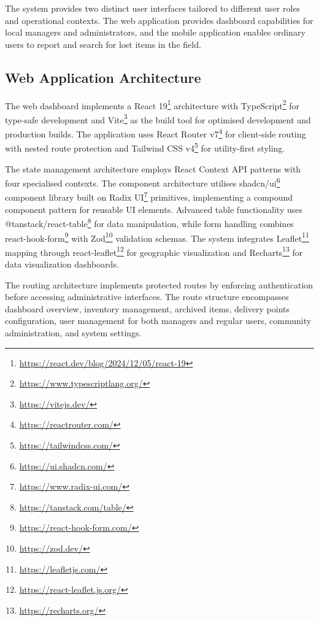The system provides two distinct user interfaces tailored to different user roles and operational contexts. The web application provides dashboard capabilities for local managers and administrators, and the mobile application enables ordinary users to report and search for lost items in the field.

\subsection{Web Application Architecture} \label{subsection:web_application}

The web dashboard implements a React 19\footnote{\url{https://react.dev/blog/2024/12/05/react-19}} architecture with TypeScript\footnote{\url{https://www.typescriptlang.org/}} for type-safe development and Vite\footnote{\url{https://vitejs.dev/}} as the build tool for optimised development and production builds. The application uses React Router v7\footnote{\url{https://reactrouter.com/}} for client-side routing with nested route protection and Tailwind CSS v4\footnote{\url{https://tailwindcss.com/}} for utility-first styling.

The state management architecture employs React Context API patterns with four specialised contexts. The component architecture utilises shadcn/ui\footnote{\url{https://ui.shadcn.com/}} component library built on Radix UI\footnote{\url{https://www.radix-ui.com/}} primitives, implementing a compound component pattern for reusable UI elements. Advanced table functionality uses @tanstack/react-table\footnote{\url{https://tanstack.com/table/}} for data manipulation, while form handling combines react-hook-form\footnote{\url{https://react-hook-form.com/}} with Zod\footnote{\url{https://zod.dev/}} validation schemas. The system integrates Leaflet\footnote{\url{https://leafletjs.com/}} mapping through react-leaflet\footnote{\url{https://react-leaflet.js.org/}} for geographic visualization and Recharts\footnote{\url{https://recharts.org/}} for data visualization dashboards.

The routing architecture implements protected routes by enforcing authentication before accessing administrative interfaces. The route structure encompasses dashboard overview, inventory management, archived items, delivery points configuration, user management for both managers and regular users, community administration, and system settings.


